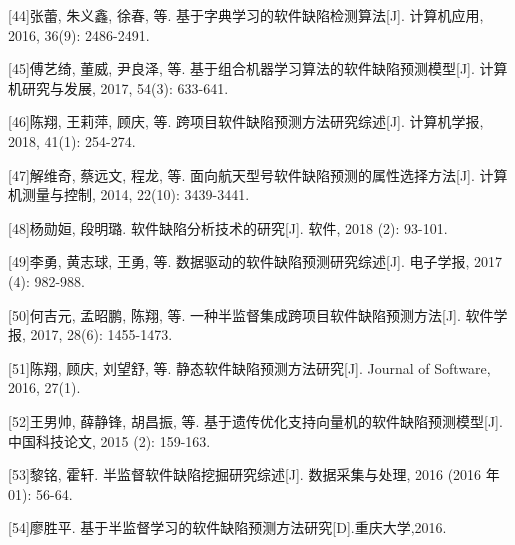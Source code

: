 \documentclass[12pt, a4paper]{article}
\begin{document}
[44]张蕾, 朱义鑫, 徐春, 等. 基于字典学习的软件缺陷检测算法[J]. 计算机应用, 2016, 36(9): 2486-2491.

[45]傅艺绮, 董威, 尹良泽, 等. 基于组合机器学习算法的软件缺陷预测模型[J]. 计算机研究与发展, 2017, 54(3): 633-641.

[46]陈翔, 王莉萍, 顾庆, 等. 跨项目软件缺陷预测方法研究综述[J]. 计算机学报, 2018, 41(1): 254-274.

[47]解维奇, 蔡远文, 程龙, 等. 面向航天型号软件缺陷预测的属性选择方法[J]. 计算机测量与控制, 2014, 22(10): 3439-3441.

[48]杨勋姮, 段明璐. 软件缺陷分析技术的研究[J]. 软件, 2018 (2): 93-101.

[49]李勇, 黄志球, 王勇, 等. 数据驱动的软件缺陷预测研究综述[J]. 电子学报, 2017 (4): 982-988.

[50]何吉元, 孟昭鹏, 陈翔, 等. 一种半监督集成跨项目软件缺陷预测方法[J]. 软件学报, 2017, 28(6): 1455-1473.

[51]陈翔, 顾庆, 刘望舒, 等. 静态软件缺陷预测方法研究[J]. Journal of Software, 2016, 27(1).

[52]王男帅, 薛静锋, 胡昌振, 等. 基于遗传优化支持向量机的软件缺陷预测模型[J]. 中国科技论文, 2015 (2): 159-163.

[53]黎铭, 霍轩. 半监督软件缺陷挖掘研究综述[J]. 数据采集与处理, 2016 (2016 年01): 56-64.

[54]廖胜平. 基于半监督学习的软件缺陷预测方法研究[D].重庆大学,2016.
\end{document}
